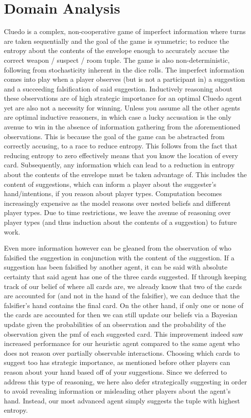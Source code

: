 \documentclass[msc, deptreport, ai, romanprepages]{infthesis}
\begin{document}
\section{Domain Analysis}
Cluedo is a complex, non-cooperative game of imperfect information where turns are taken sequentially and the goal of the game is symmetric; to reduce the entropy about the contents of the envelope enough to accurately accuse the correct weapon / suspect / room tuple. The game is also non-deterministic, following from stochasticity inherent in the dice rolls. The imperfect information comes into play when a player observes (but is not a participant in) a suggestion and a succeeding falsification of said suggestion. Inductively reasoning about these observations are of high strategic importance for an optimal Cluedo agent yet are also not a necessity for winning. Unless you assume all the other agents are optimal inductive reasoners, in which case a lucky accusation is the only avenue to win in the absence of information gathering from the aforementioned observations. This is because the goal of the game can be abstracted from correctly accusing, to a race to reduce entropy. This follows from the fact that reducing entropy to zero effectively means that you know the location of every card. Subsequently, any information which can lead to a reduction in entropy about the contents of the envelope must be taken advantage of. This includes the content of suggestions, which can inform a player about the suggester’s hand/intentions, if you reason about player types. Computation becomes increasingly expensive as the model reasons over nested beliefs and different player types. Due to time restrictions, we leave the avenue of reasoning over player types (and thus induction about the contents of a suggestion) to future work. 

Even more information however can be gleaned from the observation of who falsified the suggestion in conjunction with the content of the suggestion. If a suggestion has been falsified by another agent, it can be said with absolute certainty that said agent has one of the three cards suggested. If through keeping track of our belief of where all cards are, we already know that two of the cards are accounted for (and not in the hand of the falsifier), we can deduce that the falsifier’s hand contains the final card. On the other hand, if only one or none of the cards are accounted for then we can still update our beliefs via a Bayesian update given the probabilities of an observation and the probability of the observation given the pmf of each suggested card. This improvement indeed saw increased performance for our heuristic agent compared to the same agent who does not reason over partially observable interactions. Choosing which cards to suggest too has strategic importance, as mentioned before other players can reason about your hand based off of your suggestions. Since we deferred to address this type of reasoning, we here also defer strategically suggesting in order to avoid revealing information or misleading other players about the agent’s hand. Instead, our most advanced agent simply suggests the tuple with highest entropy. 
\end{document}
